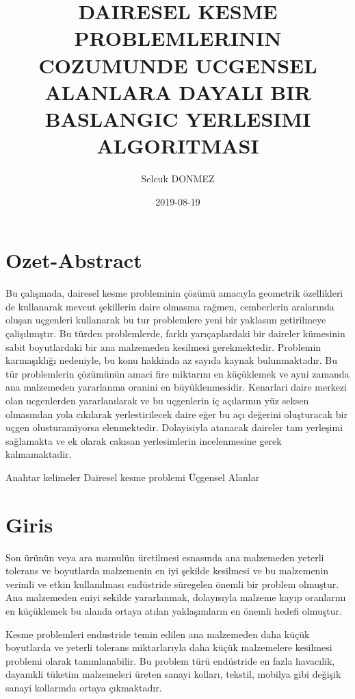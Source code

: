 \documentclass[]{book}
\title{DAIRESEL KESME PROBLEMLERININ COZUMUNDE UCGENSEL ALANLARA DAYALI BIR BASLANGIC YERLESIMI ALGORITMASI}
\author{Selcuk DONMEZ}
\date{2019-08-19}
\newenvironment{Shaded}{\begin{snugshade}}{\end{snugshade}}
\newcommand{\NormalTok}[1]{#1}
\begin{document}
\maketitle

{
\setcounter{tocdepth}{1}
\tableofcontents
}
\hypertarget{ozet-abstract}{%
\chapter{Ozet-Abstract}\label{ozet-abstract}}

Bu çalışmada, dairesel kesme probleminin çözümü amacıyla geometrik özellikleri de kullanarak mevcut şekillerin daire olmasına rağmen, cemberlerin aralarında oluşan uçgenleri kullanarak bu tur problemlere yeni bir yaklasım getirilmeye çalişılmıştır. Bu türden problemlerde, farklı yarıçaplardaki bir daireler kümesinin sabit boyutlardaki bir ana malzemeden kesilmesi gerekmektedir. Problemin karmaşıklığı nedeniyle, bu konu hakkinda az sayıda kaynak bulunmaktadır. Bu tür problemlerin çözümünün amaci fire miktarını en küçüklemek ve ayni zamanda ana malzemeden yararlanma oranini en büyüklenmesidir. Kenarlari daire merkezi olan ucgenlerden yararlanılarak ve bu uçgenlerin iç açılarının yüz seksen olmasından yola cıkılarak yerlestirilecek daire eğer bu açı değerini oluşturacak bir uçgen olusturamiyorsa elenmektedir. Dolayisiyla atanacak daireler tam yerleşimi sağlamakta ve ek olarak cakısan yerlesimlerin incelenmesine gerek kalmamaktadir.

\begin{Shaded}
\begin{Highlighting}[]
\NormalTok{Anahtar kelimeler}
\NormalTok{Dairesel kesme problemi}
\NormalTok{Üçgensel Alanlar}
\end{Highlighting}
\end{Shaded}

\hypertarget{intro}{%
\chapter{Giris}\label{intro}}

Son ürünün veya ara mamulün üretilmesi esnasında ana malzemeden yeterli tolerans ve boyutlarda malzemenin en iyi şekilde kesilmesi ve bu malzemenin verimli ve etkin kullanılması endüstride süregelen önemli bir problem olmuştur. Ana malzemeden eniyi sekilde yararlanmak, dolayısıyla malzeme kayıp oranlarını en küçüklemek bu alanda ortaya atılan yaklaşımların en önemli hedefi olmuştur.

Kesme problemleri endustride temin edilen ana malzemeden daha küçük boyutlarda ve yeterli tolerans miktarlarıyla daha küçük malzemelere kesilmesi problemi olarak tanımlanabilir. Bu problem türü endüstride en fazla havacılik, dayanıkli tüketim malzemeleri üreten sanayi kolları, tekstil, mobilya gibi değişik sanayi kollarında ortaya çıkmaktadır.
\end{document}
